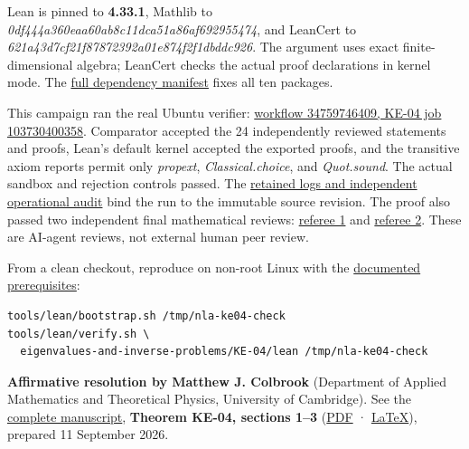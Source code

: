 \documentclass[11pt,a4paper]{article}
\makeatletter
\renewcommand{\subsection}{\Needspace{4\baselineskip}\@startsection{subsection}{2}{0pt}{9pt plus 1pt minus 1pt}{3pt}{\sffamily\bfseries\normalsize\color{ink}}}
\makeatother
\begin{document}
Lean is pinned to \textbf{4.33.1}, Mathlib to
\textit{0df444a360eaa60ab8c11dca51a86af692955474}, and LeanCert to
\textit{621a43d7cf21f87872392a01e874f2f1dbddc926}. The argument uses
exact finite-dimensional algebra; LeanCert checks the actual proof
declarations in kernel mode. The
\href{https://github.com/ajt60gaibb/OpenProblemsInNLA/blob/main/eigenvalues-and-inverse-problems/KE-04/lean/lake-manifest.json}{full
dependency manifest} fixes all ten packages.

This campaign ran the real Ubuntu verifier:
\href{https://github.com/sgstepaniants/OpenProblemsInNLA/actions/runs/34759746409/job/103730400358}{workflow
34759746409, KE-04 job 103730400358}. Comparator accepted the 24
independently reviewed statements and proofs, Lean's default kernel
accepted the exported proofs, and the transitive axiom reports permit
only \textit{propext}, \textit{Classical.choice}, and
\textit{Quot.sound}. The actual sandbox and rejection controls passed.
The
\href{https://github.com/ajt60gaibb/OpenProblemsInNLA/blob/main/eigenvalues-and-inverse-problems/KE-04/lean/verification/linux-2026-09-13/README.md}{retained
logs and independent operational audit} bind the run to the immutable
source revision. The proof also passed two independent final
mathematical reviews:
\href{https://github.com/ajt60gaibb/OpenProblemsInNLA/blob/main/eigenvalues-and-inverse-problems/KE-04/lean/reviews/final-referee-1.md}{referee
1} and
\href{https://github.com/ajt60gaibb/OpenProblemsInNLA/blob/main/eigenvalues-and-inverse-problems/KE-04/lean/reviews/final-referee-2.md}{referee
2}. These are AI-agent reviews, not external human peer review.

From a clean checkout, reproduce on non-root Linux with the
\href{https://github.com/ajt60gaibb/OpenProblemsInNLA/blob/main/tools/lean/HARNESS.md}{documented
prerequisites}:

\begin{verbatim}
tools/lean/bootstrap.sh /tmp/nla-ke04-check
tools/lean/verify.sh \
  eigenvalues-and-inverse-problems/KE-04/lean /tmp/nla-ke04-check
\end{verbatim}

\subsection{Resolution --- 2026-09-11}\label{resolution-2026-09-11}

\textbf{Affirmative resolution by Matthew J. Colbrook} (Department of
Applied Mathematics and Theoretical Physics, University of Cambridge).
See the
\href{https://github.com/ajt60gaibb/OpenProblemsInNLA/blob/main/eigenvalues-and-inverse-problems/KE-04/solution.md}{complete
manuscript}, \textbf{Theorem KE-04, sections 1--3}
(\href{https://github.com/ajt60gaibb/OpenProblemsInNLA/blob/main/eigenvalues-and-inverse-problems/KE-04/solution.pdf}{PDF}
·
\href{https://github.com/ajt60gaibb/OpenProblemsInNLA/blob/main/eigenvalues-and-inverse-problems/KE-04/solution.tex}{LaTeX}),
prepared 11 September 2026.
\end{document}
